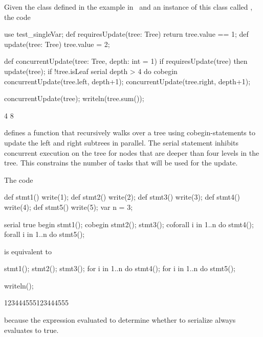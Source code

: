 \begin{example}
Given the  class defined in the example
in~ and an instance of this class
called , the code
\begin{chapelpre}
use test\_singleVar;
def requiresUpdate(tree: Tree) {
  return tree.value == 1;
}
def update(tree: Tree) {
  tree.value = 2;
}
\end{chapelpre}
\begin{chapel}
def concurrentUpdate(tree: Tree, depth: int = 1) {
  if requiresUpdate(tree) then
    update(tree);
  if !tree.isLeaf {
    serial depth > 4 do cobegin {
      concurrentUpdate(tree.left, depth+1);
      concurrentUpdate(tree.right, depth+1);
    }
  }
}
\end{chapel}
\begin{chapelpost}
concurrentUpdate(tree);
writeln(tree.sum());
\end{chapelpost}
\begin{chapeloutput}
4
8
\end{chapeloutput}
defines a function  that recursively walks over
a tree using cobegin-statements to update the left and right subtrees
in parallel.  The serial statement inhibits concurrent execution on
the tree for nodes that are deeper than four levels in the tree.  This
constrains the number of tasks that will be used for the update.
\end{example}

\begin{example}
The code
\begin{chapelpre}
def stmt1() { write(1); }
def stmt2() { write(2); }
def stmt3() { write(3); }
def stmt4() { write(4); }
def stmt5() { write(5); }
var n = 3;
\end{chapelpre}
\begin{chapel}
serial true {
  begin stmt1();
  cobegin {
    stmt2();
    stmt3();
  }
  coforall i in 1..n do stmt4();
  forall i in 1..n do stmt5();
}
\end{chapel}
is equivalent to
\begin{chapel}
stmt1();
{
  stmt2();
  stmt3();
}
for i in 1..n do stmt4();
for i in 1..n do stmt5();
\end{chapel}
\begin{chapelpost}
writeln();
\end{chapelpost}
\begin{chapeloutput}
123444555123444555
\end{chapeloutput}
because the expression evaluated to determine whether to serialize
always evaluates to true.
\end{example}

